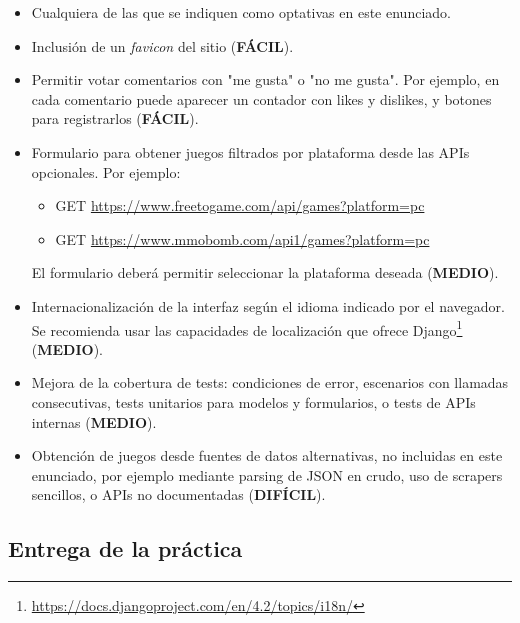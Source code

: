 \begin{itemize}
\item Cualquiera de las que se indiquen como optativas en este enunciado.

\item Inclusión de un \emph{favicon} del sitio (\textbf{FÁCIL}).

\item Permitir votar comentarios con "me gusta" o "no me gusta". Por ejemplo, en cada comentario puede aparecer un contador con likes y dislikes, y botones para registrarlos (\textbf{FÁCIL}).

\item Formulario para obtener juegos filtrados por plataforma desde las APIs opcionales. Por ejemplo:
\begin{itemize}
\item GET \url{https://www.freetogame.com/api/games?platform=pc}
\item GET \url{https://www.mmobomb.com/api1/games?platform=pc}
\end{itemize}
El formulario deberá permitir seleccionar la plataforma deseada (\textbf{MEDIO}).

\item Internacionalización de la interfaz según el idioma indicado por el navegador. Se recomienda usar las capacidades de localización que ofrece Django\footnote{\url{https://docs.djangoproject.com/en/4.2/topics/i18n/}} (\textbf{MEDIO}).

\item Mejora de la cobertura de tests: condiciones de error, escenarios con llamadas consecutivas, tests unitarios para modelos y formularios, o tests de APIs internas (\textbf{MEDIO}).

\item Obtención de juegos desde fuentes de datos alternativas, no incluidas en este enunciado, por ejemplo mediante parsing de JSON en crudo, uso de scrapers sencillos, o APIs no documentadas (\textbf{DIFÍCIL}).
\end{itemize}

\subsection{Entrega de la práctica}

